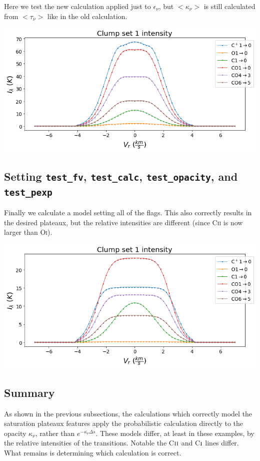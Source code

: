 \documentclass[a4paper]{article}
\newcommand{\mathsc}[1]{{\normalfont\textsc{#1}}}
\begin{document}
    Here we test the new calculation applied just to \(\epsilon_\nu\), but \(<\kappa_\nu>\) is still calculated from \(<\tau_\nu>\) like in the old calculation.

    \includegraphics*[width=\linewidth]{voxel_error_fv-calc-opacity.png}

    \subsection{Setting \texttt{test\_fv}, \texttt{test\_calc}, \texttt{test\_opacity}, and \texttt{test\_pexp}}

    Finally we calculate a model setting all of the flags.
    This also correctly results in the desired plateaux, but the relative intensities are different (since C\textsc{ii} is now larger than O\textsc{i}).

    \includegraphics*[width=\linewidth]{voxel_error_fv-calc-opacity-pexp.png}

    \subsection{Summary}

    As shown in the previous subsections, the calculations which correctly model the saturation plateaux features apply the probabilistic calculation directly to the opacity \(\kappa_\nu\), rather than \(e^{-\kappa_\nu \Delta s}\).
    These models differ, at least in these examples, by the relative intensities of the transitions.
    Notable the C\(\mathsc{ii}\) and C\(\mathsc{i}\) lines differ.
    What remains is determining which calculation is correct.
\end{document}

